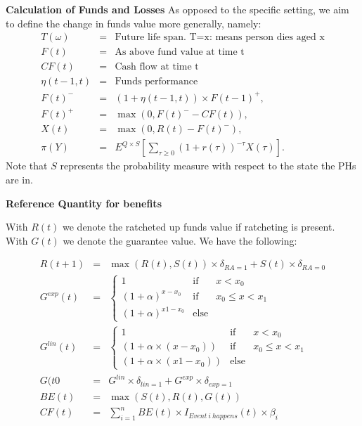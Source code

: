 \documentclass[10pt, a4paper,landscape]{article}
\begin{document}
{\bf Calculation of Funds and Losses}
As opposed to the specific setting, we aim to define the change in funds value more generally, namely:
\begin{eqnarray*}
T(\omega) & = & \mbox{Future life span. T=x: means person dies aged x}\\
F(t)      & = & \mbox{As above fund value at time t}\\
CF(t)     & = & \mbox{Cash flow at time t} \\
\eta(t-1,t)&= & \mbox{Funds performance} \\
F(t)^-    &= & (1 + \eta(t-1,t)) \times F(t-1)^+, \\
F(t)^+    & = & \max(0, F(t)^- - CF(t)), \\
X(t)      & = & \max(0,R(t) - F(t)^-), \\[1ex] %
\pi(Y) & = & E^{Q\times S}\left[\sum_{\tau \ge 0} (1+r(\tau))^{-\tau} X(\tau)  \right].
\end{eqnarray*}
Note that $S$ represents the probability measure with respect to the state the PHs are in. \par

{\bf Reference Quantity for benefits}

With $R(t)$ we denote the ratcheted up funds value if ratcheting is present. With $G(t)$ we denote the guarantee value. We have the following:

\begin{eqnarray*}
R(t+1) & = & \max(R(t), S(t)) \times \delta_{RA=1} + S(t) \times  \delta_{RA=0} \\
G^{exp}(t)   & = & \left\{
\begin{array}{ccc}
1 & \mbox{if} & x< x_0 \\
(1 + \alpha) ^{x-x_0} & \mbox{if} & x_0 \le x < x_1 \\
(1 + \alpha) ^{x1-x_0} & \mbox{else}
\end{array}
\right. \\
G^{lin}(t)   & = & \left\{
\begin{array}{ccc}
1 & \mbox{if} & x< x_0 \\
(1 + \alpha\times (x-x_0)) & \mbox{if} & x_0 \le x < x_1 \\
(1 + \alpha\times (x1-x_0)) & \mbox{else}
\end{array}
\right. \\
G(t0 & = & G^{lin} \times \delta_{lin = 1} + G^{exp} \times \delta_{exp = 1} \\
BE(t) & = & \max(S(t),R(t),G(t))\\
CF(t) & = & \sum_{i=1}^n BE(t) \times I_{Event\ i \ happens}(t) \times \beta_i
\end{eqnarray*}
\end{document}
